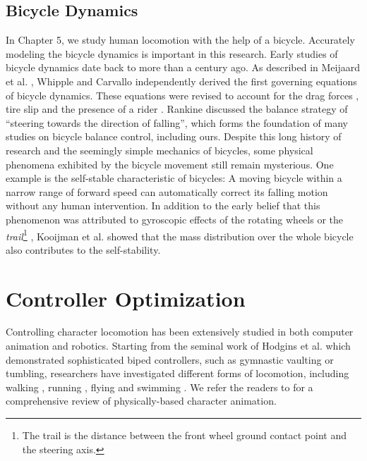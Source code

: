 \subsection{Bicycle Dynamics} In Chapter 5, we study human locomotion with the help of a bicycle. Accurately modeling the bicycle dynamics is important in this research. Early studies of bicycle dynamics date back to more than a century ago. As described in Meijaard et al. \cite{Meijaard2007}, Whipple \cite{Whipple1899} and Carvallo \cite{Carvallo1900} independently derived the first governing equations of bicycle dynamics. These equations were revised to account for the drag forces \cite{Collins1963}, tire slip \cite{Singh1964} and the presence of a rider \cite{van1975method}. Rankine \cite{Rankine1870} discussed the balance strategy of ``steering towards the direction of falling'', which forms the foundation of many studies on bicycle balance control, including ours. Despite this long history of research and the seemingly simple mechanics of bicycles, some physical phenomena exhibited by the bicycle movement still remain mysterious. One example is the self-stable characteristic of bicycles: A moving bicycle within a narrow range of forward speed can automatically correct its falling motion without any human intervention. In addition to the early belief that this phenomenon was attributed to gyroscopic effects of the rotating wheels \cite{Klein1910} or the \emph{trail}\footnote{The trail is the distance between the front wheel ground contact point and the steering axis.} \cite{Jones1970}, Kooijman et al. \cite{Kooijman2011} showed that the mass distribution over the whole bicycle also contributes to the self-stability. 

\section{Controller Optimization}

Controlling character locomotion has been extensively studied in both computer animation and robotics. Starting from the seminal work of Hodgins et al. \cite{Hodgins:1995:AHA} which demonstrated sophisticated biped
controllers, such as gymnastic vaulting or tumbling, researchers have investigated different forms of locomotion, including walking \cite{Yin:2007,Wang:2012}, running \cite{Hodgins:1995:AHA,Kwon:2010}, flying \cite{Wu:2003} and swimming \cite{Grzeszczuk:1995}.  We refer the readers to \cite{} for a comprehensive review of physically-based character animation.

